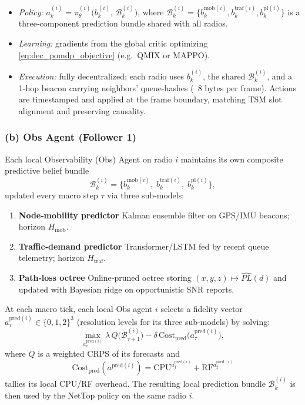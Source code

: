 \documentclass[doc.tex]{subfiles}
\begin{document}
\begin{itemize}
  \item \emph{Policy:}\;
        $a_k^{(i)}=\pi^{(i)}_{\theta}\bigl(b_k^{(i)},\,\mathcal{B}_k^{(i)}\bigr)$,
        where $\mathcal{B}_k^{(i)}=\{b_k^{\text{mob}(i)},b_k^{\text{traf}(i)},b_k^{\text{pl}(i)}\}$ is a three‑component prediction bundle shared with all radios.
  \item \emph{Learning:}\;
        gradients from the global critic optimizing
        \eqref{eq:dec_pomdp_objective} (e.g.\ QMIX or MAPPO).
  \item \emph{Execution:}\;
        fully decentralized; each radio uses
        \(b_k^{(i)}\), the shared \(\mathcal{B}_k^{(i)}\),
        and a 1‑hop beacon carrying neighbors’ queue‑hashes (~8 bytes per frame). Actions are timestamped and applied at the frame boundary, matching TSM slot alignment and preserving causality.
\end{itemize}

\subsubsection*{(b) Obs Agent (Follower 1)}

Each local Observability (Obs) Agent on radio $i$ maintains its own composite predictive belief bundle
\[
  \mathcal{B}_k^{(i)}=\bigl\{
      b_k^{\text{mob}(i)},\;
      b_k^{\text{traf}(i)},\;
      b_k^{\text{pl}(i)}
  \bigr\},
\]
updated every macro step \(\tau\) via three sub‑models:

\begin{enumerate}[label=(\roman*)]
  \item \textbf{Node‑mobility predictor}\;
        Kalman ensemble filter on GPS/IMU beacons; horizon
        \(H_{\text{mob}}\).
  \item \textbf{Traffic‑demand predictor}\;
        Transformer/LSTM fed by recent queue telemetry; horizon
        \(H_{\text{traf}}\).
  \item \textbf{Path‑loss octree}\;
        Online‑pruned octree storing $(x,y,z)\!\mapsto\!\hat{PL}(d)$ and updated with Bayesian ridge on opportunistic SNR reports.
\end{enumerate}

At each macro tick, each local Obs agent $i$ selects a fidelity vector \(a_\tau^{\text{pred}(i)}\in\{0,1,2\}^3\) (resolution levels for its three sub‑models) by solving:
\[
\boxed{
  \max_{a_\tau^{\text{pred}(i)}}
      \lambda\,Q\!\bigl(\mathcal{B}_{\tau+1}^{(i)}\bigr)
      -\delta\,\mathrm{Cost}_{\text{pred}}\!\bigl(a_\tau^{\text{pred}(i)}\bigr),
}
\]
where \(Q\) is a weighted CRPS of its forecasts and
\[
  \mathrm{Cost}_{\text{pred}}(a^{\text{pred}(i)})=\text{CPU}^{a^{\text{pred}(i)}_1}+\text{RF}^{a^{\text{pred}(i)}_2} 
\]
tallies its local CPU/RF overhead. The resulting local prediction bundle $\mathcal{B}_k^{(i)}$ is then used by the NetTop policy on the same radio $i$.
\end{document}
